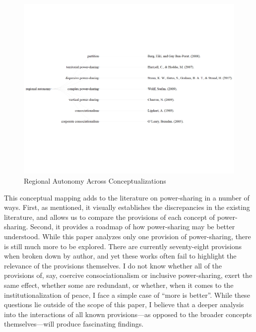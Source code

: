\documentclass[12pt]{article}
\begin{document}
\begin{figure}[H]
	\begin{center}
		\includegraphics[width = 6in]{reg_aut_ontology_vis.png}
	\end{center}
\caption{Regional Autonomy Across Conceptualizations}
\end{figure}

This conceptual mapping adds to the literature on power-sharing in a number of ways. First, as mentioned, it visually establishes the discrepancies in the existing literature, and allows us to compare the provisions of each concept of power-sharing. Second, it provides a roadmap of how power-sharing may be better understood. While this paper analyzes only one provision of power-sharing, there is still much more to be explored. There are currently seventy-eight provisions when broken down by author, and yet these works often fail to highlight the relevance of the provisions themselves. I do not know whether all of the provisions of, say, coercive consociationalism or inclusive power-sharing, exert the same effect, whether some are redundant, or whether, when it comes to the institutionalization of peace, I face a simple case of ``more is better''. While these questions lie outside of the scope of this paper, I believe that a deeper analysis into the interactions of all known provisions---as opposed to the broader concepts themselves---will produce fascinating findings. 
\end{document}
